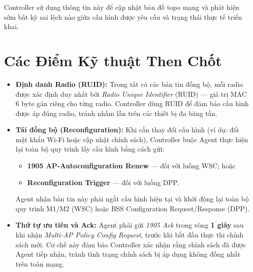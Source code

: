 Controller sử dụng thông tin này để cập nhật bản đồ topo mạng và phát hiện sớm
bất kỳ sai lệch nào giữa cấu hình được yêu cầu và trạng thái thực tế triển khai.


\section{Các Điểm Kỹ thuật Then Chốt}

\begin{itemize}
	\item \textbf{Định danh Radio (RUID):} Trong tất cả các bản tin đồng bộ, mỗi radio
	được xác định duy nhất bởi \textit{Radio Unique Identifier} (RUID) --- giá trị
	MAC 6 byte gán riêng cho từng radio. Controller dùng RUID để đảm bảo cấu hình
	được áp đúng radio, tránh nhầm lẫn trên các thiết bị đa băng tần.
	
	\item \textbf{Tái đồng bộ (Reconfiguration):} Khi cần thay đổi cấu hình (ví dụ: đổi
	mật khẩu Wi-Fi hoặc cập nhật chính sách), Controller buộc Agent thực hiện lại
	toàn bộ quy trình lấy cấu hình bằng cách gửi:
	\begin{itemize}
		\item \textbf{1905 AP-Autoconfiguration Renew} --- đối với luồng WSC; hoặc
		\item \textbf{Reconfiguration Trigger} --- đối với luồng DPP.
	\end{itemize}
	Agent nhận bản tin này phải ngắt cấu hình hiện tại và khởi động lại toàn bộ
	quy trình M1/M2 (WSC) hoặc BSS Configuration Request/Response (DPP).
	
	\item \textbf{Thứ tự ưu tiên và Ack:} Agent phải gửi \textit{1905 Ack} trong vòng
	\textbf{1 giây} sau khi nhận \textit{Multi-AP Policy Config Request}, trước khi
	bắt đầu thực thi chính sách mới. Cơ chế này đảm bảo Controller xác nhận rằng
	chính sách đã được Agent tiếp nhận, tránh tình trạng chính sách bị áp dụng
	không đồng nhất trên toàn mạng.
\end{itemize}